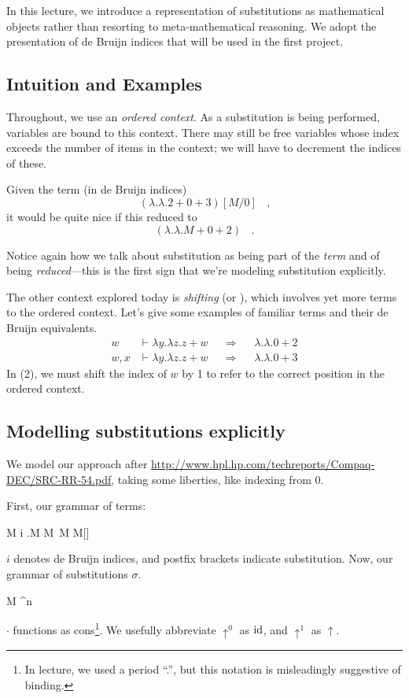 
In this lecture, we introduce a representation of substitutions as mathematical objects
rather than resorting to meta-mathematical reasoning. We adopt the presentation of de
Bruijn indices that will be used in the first project.

\subsection{Intuition and Examples}

Throughout, we use an \emph{ordered context}. As a substitution is being performed,
variables are bound to this context. There may still be free variables whose index
exceeds the number of items in the context; we will have to decrement the indices
of these.

Given the term (in de Bruijn indices)
\[ (\lambda. \lambda. 2 + 0 + 3) [M/0]~~~~\text{,} \]
it would be quite nice if this reduced to
\[ (\lambda. \lambda. M + 0 + 2)~~~~\text{.} \]

Notice again how we talk about substitution as being part of the \emph{term} and of
being \emph{reduced}---this is the first sign that we're modeling substitution
explicitly.

The other context explored today is \emph{shifting} (or ), which involves
yet more terms to the ordered context. Let's give some examples of familiar terms and
their de Bruijn equivalents.
\begin{align}
  w &\vdash \lambda y. \lambda z. z+w && \Longrightarrow && \lambda.\lambda. 0 + 2\\
  w, x & \vdash \lambda y. \lambda z. z + w && \Longrightarrow && \lambda. \lambda. 0 + 3
\end{align}
In (2), we must shift the index of $w$ by 1 to refer to the correct position in
the ordered context.

\subsection{Modelling substitutions explicitly}
We model our approach after \url{http://www.hpl.hp.com/techreports/Compaq-DEC/SRC-RR-54.pdf},
taking some liberties, like indexing from 0.

First, our grammar of terms:
\begin{bnf}
  M \bnfeq i \alt \lambda.M \alt M~M \alt M[\sigma]
\end{bnf}
$i$ denotes de Bruijn indices, and postfix brackets indicate substitution. Now, our grammar
of substitutions $\sigma$.
\begin{bnf}
  \sigma \bnfeq M \cdot \sigma \alt \uparrow^n
\end{bnf}
$\cdot$ functions as cons\footnote{In lecture, we used a period ``.'', but this notation is misleadingly
suggestive of binding.}. We usefully abbreviate $\uparrow^0$ as $\operatorname{id}$, and $\uparrow^1$ as
$\uparrow$.

